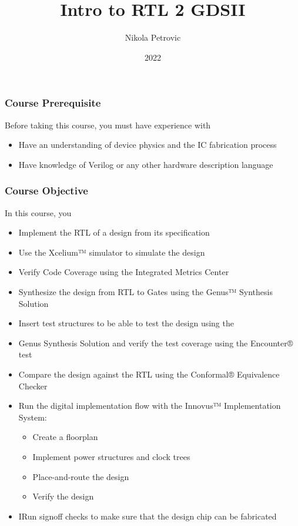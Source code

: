 \documentclass{beamer}
\title{Intro to RTL 2 GDSII}
\author{Nikola Petrovic}
\institute{University of Belgrade, School of Electrical Engineering}
\date{2022}
\begin{document}
\frame{\titlepage}

\begin{frame}
\frametitle{Course Prerequisite}

Before taking this course, you must have experience with
\begin{itemize}
 \item<1-> Have an understanding of device physics and the IC fabrication process
 \item<1-> Have knowledge of Verilog or any other hardware description language
\end{itemize}

\end{frame}

\begin{frame}
\frametitle{Course Objective}

In this course, you 
\begin{itemize}
 \item Implement the RTL of a design from its specification
 \item Use the Xcelium™ simulator to simulate the design
 \item Verify Code Coverage using the Integrated Metrics Center
 \item Synthesize the design from RTL to Gates using the Genus™ Synthesis Solution
 \item Insert test structures to be able to test the design using the     \item Genus Synthesis Solution and verify the test coverage using the Encounter® test
 \item Compare the design against the RTL using the Conformal® Equivalence Checker
 \item Run the digital implementation flow with the Innovus™ Implementation System: 
 	\begin{itemize}
	\item Create a floorplan
	\item Implement power structures and clock trees
	\item Place-and-route the design
	\item Verify the design
	\end{itemize}
\item IRun signoff checks to make sure that the design chip can be fabricated
\end{itemize}

\end{frame}
\end{document}
